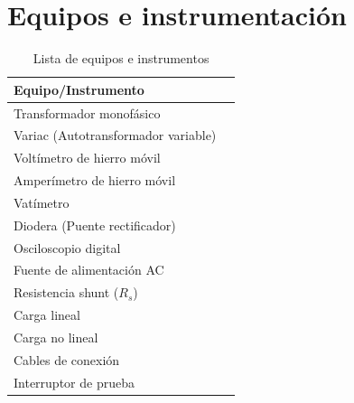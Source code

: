
\section{Equipos e instrumentación}


\begin{table}[h]
    \centering
    \caption{Lista de equipos e instrumentos}
    \begin{tabular}{lc}
        \toprule
        \textbf{Equipo/Instrumento} \\
        \midrule
        Transformador monofásico \\
        Variac (Autotransformador variable) \\
        Voltímetro de hierro móvil \\
        Amperímetro de hierro móvil \\
        Vatímetro \\
        Diodera (Puente rectificador) \\
        Osciloscopio digital \\
        Fuente de alimentación AC \\
        Resistencia shunt ($R_s$) \\
        Carga lineal \\
        Carga no lineal \\
        Cables de conexión \\
        Interruptor de prueba \\
        \bottomrule
    \end{tabular}
\end{table}